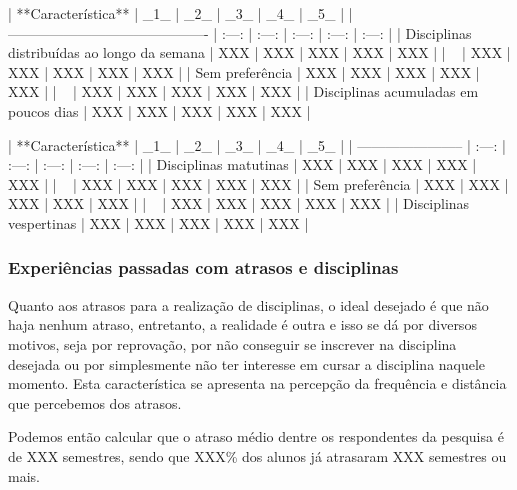         | **Característica**                          |  _1_  |  _2_  |  _3_  |  _4_  |  _5_  |
        | ------------------------------------------- | :---: | :---: | :---: | :---: | :---: |
        | Disciplinas distribuídas ao longo da semana |  XXX  |  XXX  |  XXX  |  XXX  |  XXX  |
        | ~                                           |  XXX  |  XXX  |  XXX  |  XXX  |  XXX  |
        | Sem preferência                             |  XXX  |  XXX  |  XXX  |  XXX  |  XXX  |
        | ~                                           |  XXX  |  XXX  |  XXX  |  XXX  |  XXX  |
        | Disciplinas acumuladas em poucos dias       |  XXX  |  XXX  |  XXX  |  XXX  |  XXX  |

        | **Característica**      |  _1_  |  _2_  |  _3_  |  _4_  |  _5_  |
        | ----------------------- | :---: | :---: | :---: | :---: | :---: |
        | Disciplinas matutinas   |  XXX  |  XXX  |  XXX  |  XXX  |  XXX  |
        | ~                       |  XXX  |  XXX  |  XXX  |  XXX  |  XXX  |
        | Sem preferência         |  XXX  |  XXX  |  XXX  |  XXX  |  XXX  |
        | ~                       |  XXX  |  XXX  |  XXX  |  XXX  |  XXX  |
        | Disciplinas vespertinas |  XXX  |  XXX  |  XXX  |  XXX  |  XXX  |

    \subsubsection{Experiências passadas com atrasos e disciplinas} %

        Quanto aos atrasos para a realização de disciplinas, o ideal desejado é que não haja nenhum atraso, entretanto, a realidade é outra e isso se dá por diversos motivos, seja por reprovação, por não conseguir se inscrever na disciplina desejada ou por simplesmente não ter interesse em cursar a disciplina naquele momento. Esta característica se apresenta na percepção da frequência e distância que percebemos dos atrasos.

        Podemos então calcular que o atraso médio dentre os respondentes da pesquisa é de XXX semestres, sendo que XXX\% dos alunos já atrasaram XXX semestres ou mais.

